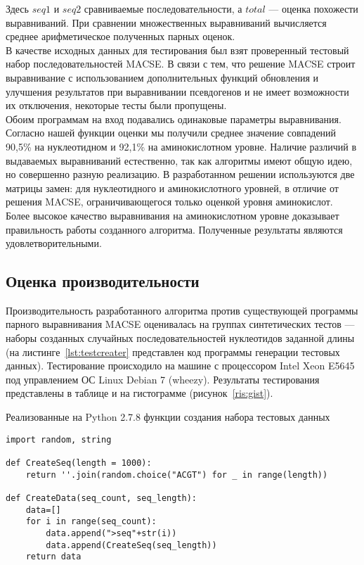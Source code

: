 Здесь $seq1$ и $seq2$ сравниваемые последовательности, а $total$ --- оценка похожести выравниваний. При сравнении множественных выравниваний вычисляется среднее арифметическое полученных парных оценок.\\
\indent В качестве исходных данных для тестирования был взят проверенный тестовый набор последовательностей MACSE. В связи с тем, что решение MACSE строит выравнивание с использованием дополнительных функций обновления и улучшения результатов при выравнивании псевдогенов и не имеет возможности их отключения, некоторые тесты были пропущены. \\
\indent Обоим программам на вход подавались одинаковые параметры выравнивания. Согласно нашей функции оценки мы получили среднее значение совпадений 90,5\% на нуклеотидном и 92,1\% на аминокислотном уровне. Наличие различий в выдаваемых выравниваний естественно, так как алгоритмы имеют общую идею, но совершенно разную реализацию. В разработанном решении используются две матрицы замен: для нуклеотидного и аминокислотного уровней, в отличие от решения MACSE, ограничивающегося только оценкой уровня аминокислот. Более высокое качество выравнивания на аминокислотном уровне доказывает правильность работы созданного алгоритма. Полученные результаты являются удовлетворительными.

\subsection[Оценка производительности]{\large Оценка производительности}
\hspace{\parindent} Производительность разработанного алгоритма против существующей программы парного выравнивания MACSE оценивалась на группах синтетических тестов --- наборы созданных случайных последовательностей нуклеотидов заданной длины (на листинге~\ref{lst:testcreater} представлен код программы генерации тестовых данных).  Тестирование происходило на машине с процессором Intel Xeon E5645 под управлением ОС Linux Debian 7 (wheezy). Результаты тестирования представлены в таблице и на гистограмме (рисунок~\ref{ris:gist}).
\begin{algorithm}
	\caption{Реализованные на Python 2.7.8 функции создания набора тестовых данных} \label{lst:testcreater}
	\begin{lstlisting}
import random, string

def CreateSeq(length = 1000):
    return ''.join(random.choice("ACGT") for _ in range(length))

def CreateData(seq_count, seq_length):
    data=[]
    for i in range(seq_count):
        data.append(">seq"+str(i))
        data.append(CreateSeq(seq_length))
    return data
	\end{lstlisting}
\end{algorithm}

